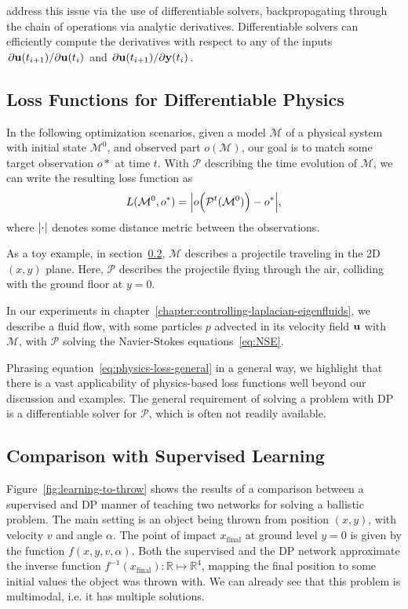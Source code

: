 \cite{holl2019pdecontrol} address this issue via the use of differentiable
solvers, backpropagating through the chain of operations via analytic
derivatives.  Differentiable solvers can efficiently compute the derivatives
with respect to any of the inputs $\pdv*{\vb{u}(t_{i+1})}{\vb{u}(t_i)}$ and
$\pdv*{\vb{u}(t_{i+1})}{\vb{y}(t_i)}$. 

\subsection{Loss Functions for Differentiable Physics}
\label{dp-loss}
In the following optimization scenarios, given a model $\mathcal{M}$ of
a physical system with initial state $\mathcal{M}^0$, and observed part
$o(\mathcal{M})$, our goal is to match some target observation $o*$ at time $t$.
With $\mathcal{P}$ describing the time evolution of $\mathcal{M}$, we can write
the resulting loss function as 
\begin{equation}\label{eq:physics-loss-general}
  L(\mathcal{M}^0, o^*) = \abs{o\Big(\mathcal{P}^t(\mathcal{M}^0)\Big) - o^*},
\end{equation}
where $\abs{\cdot}$ denotes some distance metric between the observations.

As a toy example, in section~\ref{section:comparison-with-supervised-learning},
$\mathcal{M}$ describes a projectile traveling in the 2D $(x,y)$ plane. Here,
$\mathcal{P}$ describes the projectile flying through the air, colliding with
the ground floor at $y=0$.

In our experiments in chapter~\ref{chapter:controlling-laplacian-eigenfluids},
we describe a fluid flow, with some particles $p$ advected in its velocity field
$\vb{u}$ with $\mathcal{M}$, with $\mathcal{P}$ solving the Navier-Stokes
equations~\ref{eq:NSE}.

Phrasing equation~\ref{eq:physics-loss-general} in a general way, we highlight
that there is a vast applicability of physics-based loss functions well beyond
our discussion and examples. The general requirement of solving a problem with
\ac{DP} is a differentiable solver for $\mathcal{P}$, which is often not readily
available.

\subsection{Comparison with Supervised Learning}
\label{section:comparison-with-supervised-learning}
Figure~\ref{fig:learning-to-throw} shows the results of a comparison between
a supervised and \acf{DP} manner of teaching two networks for solving
a ballistic problem. The main setting is an object being thrown from position
$(x,y)$, with velocity $v$ and angle $\alpha$. The point of impact
$x_{\text{final}}$ at ground level $y=0$ is given by the function
$f(x,y,v,\alpha)$. Both the supervised and the \ac{DP} network approximate the
inverse function $f^{-1}(x_{\text{final}}): \mathbb{R} \mapsto \mathbb{R}^4$,
mapping the final position to some initial values the object was thrown with. We
can already see that this problem is multimodal, i.e. it has multiple solutions.

